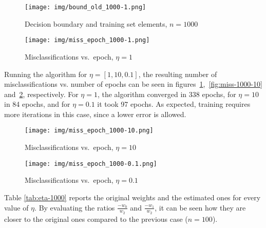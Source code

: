 \documentclass[12pt]{article}
\begin{document}
\begin{figure} [h]
    \begin{minipage}{0.45\linewidth}
    \centering
        \texttt{[image: img/bound\_old\_1000-1.png]}
        \caption{Decision boundary and training set elements, $n=1000$}
        \label{fig:train-1000}
    \end{minipage}
    \hspace{0.5cm}
    \begin{minipage}{0.45\linewidth}
    \centering
        \texttt{[image: img/miss\_epoch\_1000-1.png]}
        \caption{Misclassifications vs.\ epoch, $\eta=1$}
        \label{fig:miss-1000-1}
    \end{minipage}
\end{figure}

Running the algorithm for $\eta = [1, 10, 0.1]$, the resulting number of misclassifications vs. number of epochs can be seen in figures~\ref{fig:miss-1000-1},~\ref{fig:miss-1000-10} and~\ref{fig:miss-1000-01}, respectively.
For $\eta=1$, the algorithm converged in 338 epochs, for $\eta=10$ in 84 epochs, and for $\eta=0.1$ it took 97 epochs.
As expected, training requires more iterations in this case, since a lower error is allowed.

\begin{figure} [h]
    \begin{minipage}{0.45\linewidth}
    \centering
        \texttt{[image: img/miss\_epoch\_1000-10.png]}
        \caption{Misclassifications vs.\ epoch, $\eta=10$}
        \label{fig:miss-1000-10}
    \end{minipage}
    \hspace{0.5cm}
    \begin{minipage}{0.45\linewidth}
    \centering
        \texttt{[image: img/miss\_epoch\_1000-0.1.png]}
        \caption{Misclassifications vs.\ epoch, $\eta=0.1$}
        \label{fig:miss-1000-01}
    \end{minipage}
\end{figure}

Table \ref{tab:eta-1000} reports the original weights and the estimated ones for every value of $\eta$.
By evaluating the ratios $\frac{-w_0}{w_2}$ and $\frac{-w_1}{w_2}$, it can be seen how they are closer to the original ones compared to the previous case ($n=100$).
\end{document}
